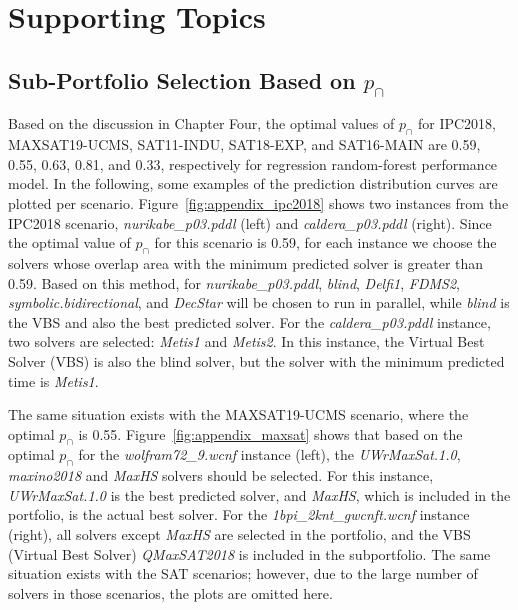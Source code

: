 
\chapter{Supporting Topics}

\section{Sub-Portfolio Selection Based on $p_{\cap}$}
Based on the discussion in Chapter Four, the optimal values of $p_{\cap}$ for IPC2018, MAXSAT19-UCMS, SAT11-INDU, SAT18-EXP, and SAT16-MAIN are 0.59, 0.55, 0.63, 0.81, and 0.33, respectively for regression random-forest performance model. In the following, some examples of the prediction distribution curves are plotted per scenario.
Figure~\ref{fig:appendix_ipc2018} shows two instances from the IPC2018 scenario, \textit{nurikabe\_p03.pddl} (left) and \textit{caldera\_p03.pddl} (right). Since the optimal value of $p_{\cap}$ for this scenario is 0.59, for each instance we choose the solvers whose overlap area with the minimum predicted solver is greater than 0.59. Based on this method, for \textit{nurikabe\_p03.pddl}, \textit{blind}, \textit{Delfi1}, \textit{FDMS2}, \textit{symbolic.bidirectional}, and \textit{DecStar} will be chosen to run in parallel, while \textit{blind} is the VBS and also the best predicted solver. For the \textit{caldera\_p03.pddl} instance, two solvers are selected: \textit{Metis1} and \textit{Metis2}. In this instance, the Virtual Best Solver (VBS) is also the blind solver, but the solver with the minimum predicted time is \textit{Metis1}.

The same situation exists with the MAXSAT19-UCMS scenario, where the optimal $p_{\cap}$ is 0.55. Figure~\ref{fig:appendix_maxsat} shows that based on the optimal $p_{\cap}$ for the \textit{wolfram72\_9.wcnf} instance (left), the \textit{UWrMaxSat.1.0}, \textit{maxino2018} and \textit{MaxHS} solvers should be selected. For this instance, \textit{UWrMaxSat.1.0} is the best predicted solver, and \textit{MaxHS}, which is included in the portfolio, is the actual best solver. For the \textit{1bpi\_2knt\_gwcnft.wcnf} instance (right), all solvers except \textit{MaxHS} are selected in the portfolio, and the VBS (Virtual Best Solver) \textit{QMaxSAT2018} is included in the subportfolio. The same situation exists with the SAT scenarios; however, due to the large number of solvers in those scenarios, the plots are omitted here.

